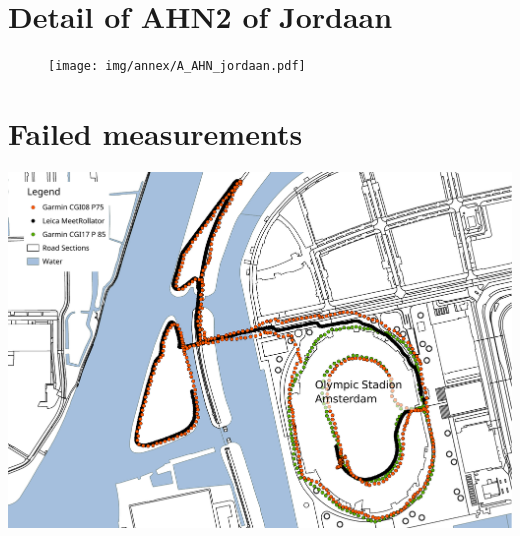 \begin{appendix}
\clearpage

\section{Detail of AHN2 of Jordaan}\label{AAHN}
\begin{figure}[h]
\texttt{[image: img/annex/A\_AHN\_jordaan.pdf]}
\centering
\end{figure} 

\section{Failed measurements}\label{Afailed}

\includegraphics[width=\textwidth]{img/annex/A_failedmeasurementsMap.pdf}


\end{appendix}
